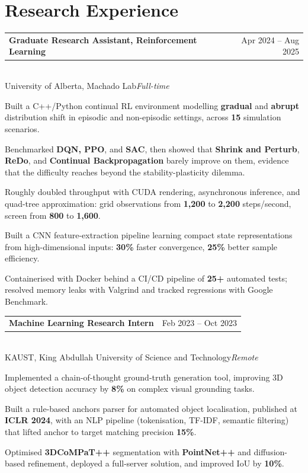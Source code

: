 \documentclass[10pt,a4paper]{article}
\makeatletter
\newcommand{\role}[4]{%
  \vspace{3pt}
  \noindent\begin{tabularx}{\textwidth}{@{}Xr@{}}
    \textbf{#1} & \textcolor{muted}{\small #4}
  \end{tabularx}\\[1pt]
  \textcolor{accent}{#2}\;\textcolor{muted}{\small\textit{#3}}\vspace{2pt}
}
\makeatother
\begin{document}
\section{Research Experience}

\role{Graduate Research Assistant, Reinforcement Learning}{University of Alberta, Machado Lab}{Full-time}{Apr 2024 -- Aug 2025}
\begin{pts}
  \item Built a C++/Python continual RL environment modelling \textbf{gradual} and \textbf{abrupt} distribution shift in episodic and non-episodic settings, across \textbf{15} simulation scenarios.
  \item Benchmarked \textbf{DQN, PPO}, and \textbf{SAC}, then showed that \textbf{Shrink and Perturb}, \textbf{ReDo}, and \textbf{Continual Backpropagation} barely improve on them, evidence that the difficulty reaches beyond the stability-plasticity dilemma.
  \item Roughly doubled throughput with CUDA rendering, asynchronous inference, and quad-tree approximation: grid observations from \textbf{1{,}200} to \textbf{2{,}200} steps/second, screen from \textbf{800} to \textbf{1{,}600}.
  \item Built a CNN feature-extraction pipeline learning compact state representations from high-dimensional inputs: \textbf{30\%} faster convergence, \textbf{25\%} better sample efficiency.
  \item Containerised with Docker behind a CI/CD pipeline of \textbf{25+} automated tests; resolved memory leaks with Valgrind and tracked regressions with Google Benchmark.
\end{pts}

\role{Machine Learning Research Intern}{KAUST, King Abdullah University of Science and Technology}{Remote}{Feb 2023 -- Oct 2023}
\begin{pts}
  \item Implemented a chain-of-thought ground-truth generation tool, improving 3D object detection accuracy by \textbf{8\%} on complex visual grounding tasks.
  \item Built a rule-based anchors parser for automated object localisation, published at \textbf{ICLR 2024}, with an NLP pipeline (tokenisation, TF-IDF, semantic filtering) that lifted anchor to target matching precision \textbf{15\%}.
  \item Optimised \textbf{3DCoMPaT++} segmentation with \textbf{PointNet++} and diffusion-based refinement, deployed a full-server solution, and improved IoU by \textbf{10\%}.
\end{pts}
\end{document}
